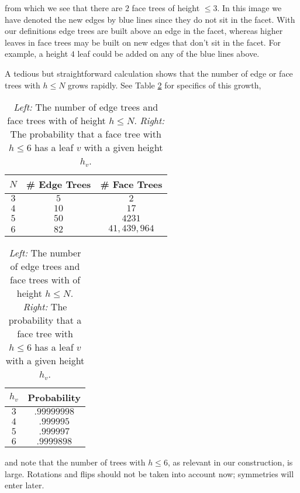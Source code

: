 \documentclass[aps,prl,twocolumn, superscriptaddress,groupedaddress,nofootinbib]{revtex4}
\begin{document}
from which we see that there are $2$ face trees of height $\leq 3$. In this
image we have denoted the new edges by blue lines since they do
not sit in the facet. With our definitions edge trees are built above an edge
in the facet, whereas higher leaves in face trees may be built on new edges
that don't sit in the facet. For example, a height $4$ leaf could be added
on any of the blue lines above.

A tedious but straightforward calculation shows that the number of
edge or face trees with $h \leq N$ grows rapidly. See 
Table \ref{tab:numedgefacetreeandprob} for specifics of this growth,
\begin{table}
\begin{tabular}{|c|c|c|}
$N$ & \# Edge Trees & \# Face Trees \\ \hline
$3$ & $5$ & $2$\\
$4$ & $10$ & $17$\\
$5$ & $50$ & $4231$ \\
$6$ & $82$ & $41,439,964$\\ \hline
\end{tabular} \hspace{1cm}
\begin{tabular}{|c|c|}
$h_v$ & Probability \\ \hline
$3$ & $.99999998$ \\
$4$ & $.999995$ \\
$5$ & $.999997$  \\
$6$ & $.9999898$ \\ \hline
\end{tabular}
\caption{\emph{Left:} The number of edge trees and face trees with of height $h\leq N$.
\emph{Right:} The probability that a face tree with $h\leq 6$ has a leaf $v$ with
a given height $h_v$.}
\label{tab:numedgefacetreeandprob}
\end{table}
and note that the number of trees with $h \leq 6$, as relevant in our
construction, is large. Rotations and flips should not be taken
into account now; symmetries will enter later.
\end{document}

